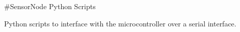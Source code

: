 \#\+Sensor\+Node Python Scripts

Python scripts to interface with the microcontroller over a serial interface. 